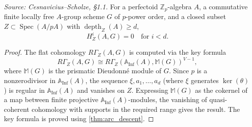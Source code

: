 \begin{theorem}
  \label{thm:perfectoid_purity}
  \textit{Source: Cesnavicius--Scholze, §1.1.}
  For a perfectoid \(\mathbb{Z}_p\)-algebra \(A\), a commutative finite locally free \(A\)-group scheme \(G\) of \(p\)-power order, and a closed subset \(Z \subset \operatorname{Spec}(A/pA)\) with \(\operatorname{depth}_Z(A) \ge d\),
  \[
    H^i_Z(A, G) = 0 \quad \text{for } i < d.
  \]
\end{theorem}

\begin{proof}
  The flat cohomology \(R\Gamma_Z(A, G)\) is computed via the key formula
  \[
    R\Gamma_Z(A, G) \cong R\Gamma_Z(\mathbb{A}_{\mathrm{Inf}}(A), \mathbb{M}(G))^{V-1},
  \]
  where \(\mathbb{M}(G)\) is the prismatic Dieudonné module of \(G\). Since \(p\) is a nonzerodivisor in \(\mathbb{A}_{\mathrm{Inf}}(A)\), the sequence \(\xi, a_1, \ldots, a_d\) (where \(\xi\) generates \(\ker(\theta)\)) is regular in \(\mathbb{A}_{\mathrm{Inf}}(A)\) and vanishes on \(Z\). Expressing \(\mathbb{M}(G)\) as the cokernel of a map between finite projective \(\mathbb{A}_{\mathrm{Inf}}(A)\)-modules, the vanishing of quasi-coherent cohomology with supports in the required range gives the result. The key formula is proved using \cref{thm:arc_descent}.
\end{proof}

